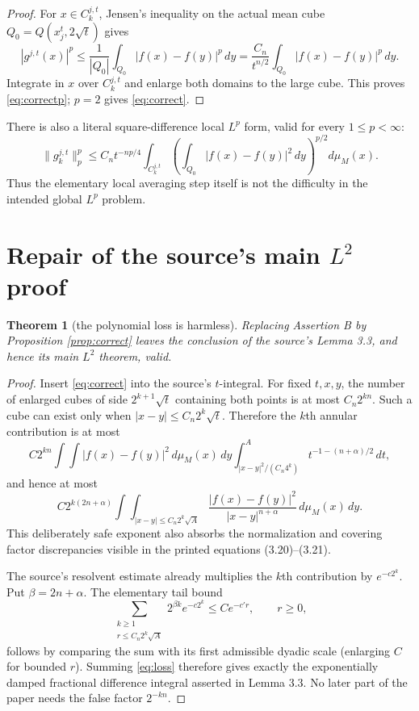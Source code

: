 \documentclass[11pt]{article}
\newtheorem{theorem}{Theorem}
\newcommand{\muM}{\mu_M}
\begin{document}
\begin{proof}
For $x\in C_k^{j,t}$, Jensen's inequality on the actual mean cube
$Q_0=Q(x_j^t,2\sqrt t)$ gives
\[
 |g^{j,t}(x)|^p
 \le \frac1{|Q_0|}\int_{Q_0}|f(x)-f(y)|^p\,dy
 =\frac{C_n}{t^{n/2}}\int_{Q_0}|f(x)-f(y)|^p\,dy.
\]
Integrate in $x$ over $C_k^{j,t}$ and enlarge both domains to the large
cube.  This proves \eqref{eq:correctp}; $p=2$ gives \eqref{eq:correct}.
\end{proof}

There is also a literal square-difference local $L^p$ form, valid for every
$1\le p<\infty$:
\[
 \lVert g_k^{j,t}\rVert_p^p
 \le C_nt^{-np/4}\int_{C_k^{j,t}}
 \left(\int_{Q_0}|f(x)-f(y)|^2\,dy\right)^{p/2}d\muM(x).
\]
Thus the elementary local averaging step itself is not the difficulty in the
intended global $L^p$ problem.

\section{Repair of the source's main \texorpdfstring{$L^2$}{L2} proof}

\begin{theorem}[the polynomial loss is harmless]\label{thm:repair}
Replacing Assertion B by Proposition \ref{prop:correct} leaves the conclusion
of the source's Lemma 3.3, and hence its main $L^2$ theorem, valid.
\end{theorem}

\begin{proof}
Insert \eqref{eq:correct} into the source's $t$-integral.  For fixed $t,x,y$,
the number of enlarged cubes of side $2^{k+1}\sqrt t$ containing both points
is at most $C_n2^{kn}$.  Such a cube can exist only when
$|x-y|\le C_n2^k\sqrt t$.  Therefore the $k$th annular contribution is at
most
\[
 C2^{kn}\int\!\!\int |f(x)-f(y)|^2\,d\muM(x)\,dy
 \int_{|x-y|^2/(C_n4^k)}^A t^{-1-(n+\alpha)/2}\,dt,
\]
and hence at most
\begin{equation}\label{eq:loss}
 C2^{k(2n+\alpha)}
 \int\!\!\int_{|x-y|\le C_n2^k\sqrt A}
 \frac{|f(x)-f(y)|^2}{|x-y|^{n+\alpha}}\,d\muM(x)\,dy.
\end{equation}
This deliberately safe exponent also absorbs the normalization and covering
factor discrepancies visible in the printed equations (3.20)--(3.21).

The source's resolvent estimate already multiplies the $k$th contribution by
$e^{-c2^k}$.  Put $\beta=2n+\alpha$.  The elementary tail bound
\[
 \sum_{\substack{k\ge1\\ r\le C_n2^k\sqrt A}}
 2^{\beta k}e^{-c2^k}\le C e^{-c'r},\qquad r\ge0,
\]
follows by comparing the sum with its first admissible dyadic scale (enlarging
$C$ for bounded $r$).  Summing \eqref{eq:loss} therefore gives exactly the
exponentially damped fractional difference integral asserted in Lemma 3.3.
No later part of the paper needs the false factor $2^{-kn}$.
\end{proof}
\end{document}
